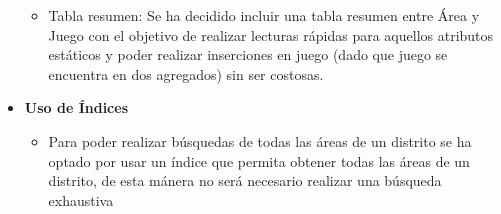\documentclass[]{article}
\begin{document}
\begin{itemize}
\begin{itemize}
        \item Tabla resumen: Se ha decidido incluir una tabla resumen entre Área y Juego con el objetivo de realizar lecturas rápidas para aquellos atributos estáticos y poder realizar inserciones en juego (dado que juego se encuentra en dos agregados) sin ser costosas.
    \end{itemize}
    \item \textbf{Uso de Índices}
    \begin{itemize}
        \item Para poder realizar búsquedas de todas las áreas de un distrito se ha optado por usar un índice que permita obtener todas las áreas de un distrito, de esta mánera no será necesario realizar una búsqueda exhaustiva
    \end{itemize}
\end{itemize}
\end{document}
